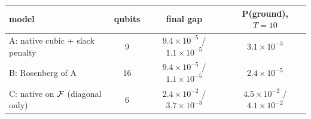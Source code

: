 \begin{tabular}{lccc}
\toprule
model & qubits & final gap & P(ground), $T{=}10$ \\
\midrule
A: native cubic \HUBO{} + slack penalty & 9 & $9.4\times10^{-5}$ / $1.1\times10^{-5}$ & $3.1\times10^{-3}$ \\
B: Rosenberg \QUBO{} of A & 16 & $9.4\times10^{-5}$ / $1.1\times10^{-5}$ & $2.4\times10^{-5}$ \\
C: native \HUBO{} on $\mathcal{F}$ (diagonal only) & 6 & $2.4\times10^{-2}$ / $3.7\times10^{-3}$ & $4.5\times10^{-2}$ / $4.1\times10^{-2}$ \\
\bottomrule
\end{tabular}
